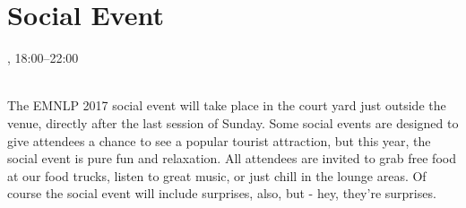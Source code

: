 \section{Social Event}
\setheaders{}{\daydateyear}

\begin{center}



\daydateyear, 18:00--22:00\vspace{1em}\\
\SocialEventLoc\\
\end{center}

The  EMNLP 2017 social event will take place in the court yard just outside the venue, directly after the last session of Sunday. Some social events are designed to give attendees a chance to see a popular tourist attraction, but this year, the social event is pure fun and relaxation. All attendees are invited to grab free food at our food trucks, listen to great music, or just chill in the lounge areas. Of course the social event will include surprises, also, but - hey, they’re surprises. 
